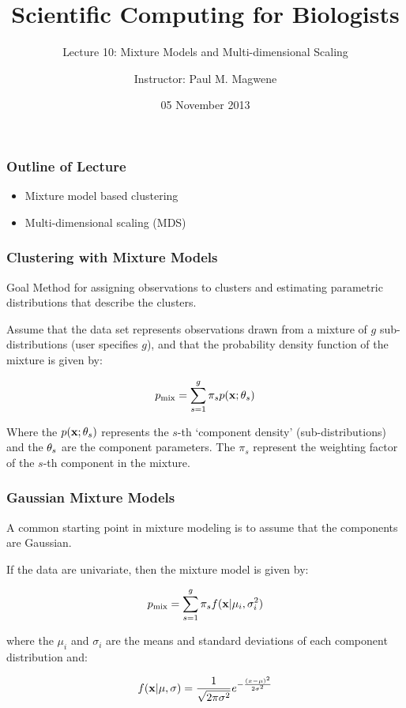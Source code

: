 \documentclass{beamer}
\title{Scientific Computing for Biologists}
\subtitle{Lecture 10: Mixture Models and Multi-dimensional Scaling} %
\author{Instructor: Paul M. Magwene}
\date{05 November 2013}
\begin{document}
\begin{frame}
\titlepage
\end{frame}



\begin{frame}
  \frametitle{Outline of Lecture}

\begin{itemize}
    \item Mixture model based clustering
    \item Multi-dimensional scaling (MDS)
\end{itemize}

\end{frame}



\begin{frame}
  \frametitle{Clustering with Mixture Models}

\begin{block}{Goal}
Method for assigning observations to clusters and estimating parametric distributions that describe the clusters.
\end{block}

    Assume that the data set represents observations drawn from a mixture of $g$ sub-distributions (user specifies $g$), and that the probability density function of the mixture is given by:

\[
p_{\mathrm{mix}} = \sum_{s=1}^g \pi_s p(\mathbf{x};\mathbf{\theta}_s)
\]

Where the $p(\mathbf{x};\mathbf{\theta}_s)$ represents the $s$-th `component density' (sub-distributions) and the $\mathbf{\theta}_s$ are the component parameters.  The $\pi_s$ represent the weighting factor of the $s$-th component in the mixture.

\end{frame}

{

}

\begin{frame}
  \frametitle{Gaussian Mixture Models}

A common starting point in mixture modeling is to assume that the components are Gaussian.

If the data are univariate, then the mixture model is given by:

\[
p_{\mathrm{mix}} = \sum_{s=1}^g \pi_s f(\mathbf{x}|\mu_i, \sigma_i^2)
\]

where the $\mu_i$ and $\sigma_i$ are the means and standard deviations of each component distribution and:

\[
f(\mathbf{x}|\mu, \sigma) = \frac{1}{\sqrt{2\pi\sigma^2}}e^{-\frac{(x-\mu)^2}{2\sigma^2}}
\]

\end{frame}
\end{document}
